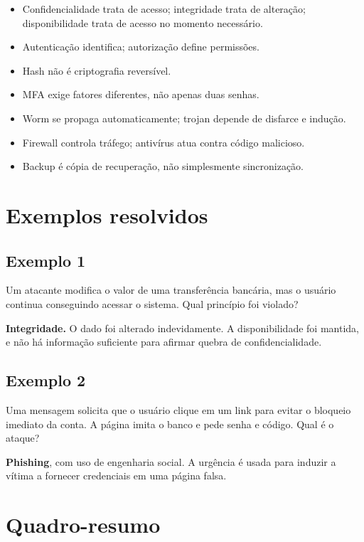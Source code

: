 \documentclass[11pt,a4paper]{article}
\begin{document}
\begin{itemize}
  \item Confidencialidade trata de acesso; integridade trata de alteração; disponibilidade trata de acesso no momento necessário.
  \item Autenticação identifica; autorização define permissões.
  \item Hash não é criptografia reversível.
  \item MFA exige fatores diferentes, não apenas duas senhas.
  \item Worm se propaga automaticamente; trojan depende de disfarce e indução.
  \item Firewall controla tráfego; antivírus atua contra código malicioso.
  \item Backup é cópia de recuperação, não simplesmente sincronização.
\end{itemize}

\section*{Exemplos resolvidos}

\subsection*{Exemplo 1}

Um atacante modifica o valor de uma transferência bancária, mas o usuário continua conseguindo acessar o sistema. Qual princípio foi violado?

\textbf{Integridade.} O dado foi alterado indevidamente. A disponibilidade foi mantida, e não há informação suficiente para afirmar quebra de confidencialidade.

\subsection*{Exemplo 2}

Uma mensagem solicita que o usuário clique em um link para evitar o bloqueio imediato da conta. A página imita o banco e pede senha e código. Qual é o ataque?

\textbf{Phishing}, com uso de engenharia social. A urgência é usada para induzir a vítima a fornecer credenciais em uma página falsa.

\section*{Quadro-resumo}
\end{document}
